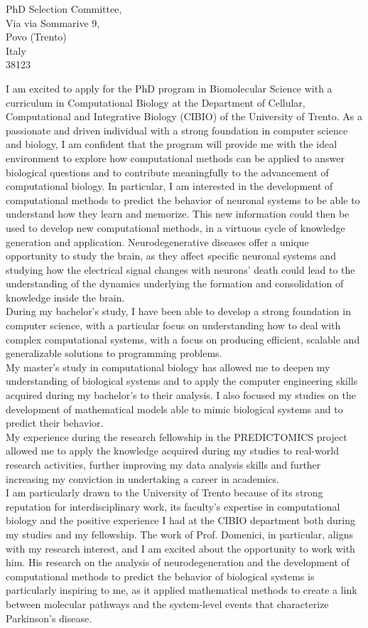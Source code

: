 \documentclass[11pt, a4paper, roman]{letter}
\begin{document}
\begin{minipage}[t]{\textwidth}
\begin{letter} {PhD Selection Committee,\\
Via via Sommarive 9,  \\Povo (Trento)\\Italy\\38123}
{I am excited to apply for the PhD program in Biomolecular Science with a curriculum in Computational Biology at the Department of Cellular, Computational and Integrative Biology (CIBIO) of the University of Trento.
As a passionate and driven individual with a strong foundation in computer science and biology, I am confident that the program will provide me with the ideal environment to explore how computational methods can be applied to answer biological questions and to contribute meaningfully to the advancement of computational biology.
In particular, I am interested in the development of computational methods to predict the behavior of neuronal systems to be able to understand how they learn and memorize.
This new information could then be used to develop new computational methods, in a virtuous cycle of knowledge generation and application.
Neurodegenerative diseases offer a unique opportunity to study the brain, as they affect specific neuronal systems and studying how the electrical signal changes with neurons' death could lead to the understanding of the dynamics underlying the formation and consolidation of knowledge inside the brain.\\
During my bachelor's study, I have been able to develop a strong foundation in computer science, with a particular focus on understanding how to deal with complex computational systems, with a focus on producing efficient, scalable and generalizable solutions to programming problems.\\
My master's study in computational biology has allowed me to deepen my understanding of biological systems and to apply the computer engineering skills acquired during my bachelor's to their analysis.
I also focused my studies on the development of mathematical models able to mimic biological systems and to predict their behavior.\\
My experience during the research fellowship in the PREDICTOMICS project allowed me to apply the knowledge acquired during my studies to real-world research activities, further improving my data analysis skills and further increasing my conviction in undertaking a career in academics.\\
I am particularly drawn to the University of Trento because of its strong reputation for interdisciplinary work, its faculty's expertise in computational biology and the positive experience I had at the CIBIO department both during my studies and my fellowship.
The work of Prof. Domenici, in particular, aligns with my research interest, and I am excited about the opportunity to work with him.
His research on the analysis of neurodegeneration and the development of computational methods to predict the behavior of biological systems is particularly inspiring to me, as it applied mathematical methods to create a link between molecular pathways and the system-level events that characterize Parkinson's disease.

}
\end{letter}
\end{minipage}
\end{document}

